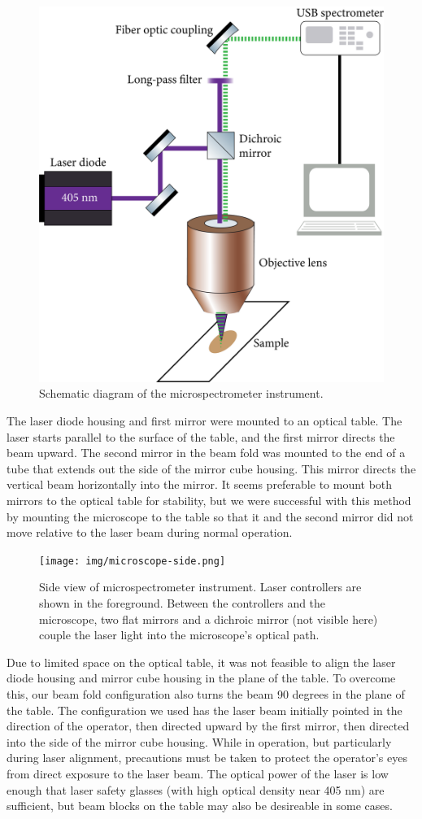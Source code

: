 \begin{figure}[h]
    \centering
    \includegraphics[width=.75\textwidth]{img/optical-diagram.png}
    \caption{Schematic diagram of the microspectrometer instrument.}
    \label{img:optical-diagram}
\end{figure}

The laser diode housing and first mirror were mounted to an optical table. The laser starts parallel to the surface of the table, and the first mirror directs the beam upward. The second mirror in the beam fold was mounted to the end of a tube that extends out the side of the mirror cube housing. This mirror directs the vertical beam horizontally into the mirror. It seems preferable to mount both mirrors to the optical table for stability, but we were successful with this method by mounting the microscope to the table so that it and the second mirror did not move relative to the laser beam during normal operation.

\begin{figure}[H]
    \centering
    \texttt{[image: img/microscope-side.png]}
    \caption[Side view of microspectrometer instrument.]{Side view of microspectrometer instrument. Laser controllers are shown in the foreground. Between the controllers and the microscope, two flat mirrors and a dichroic mirror (not visible here) couple the laser light into the microscope's optical path.}
    \label{img:microscope-side}
\end{figure}

Due to limited space on the optical table, it was not feasible to align the laser diode housing and mirror cube housing in the plane of the table. To overcome this, our beam fold configuration also turns the beam 90 degrees in the plane of the table. The configuration we used has the laser beam initially pointed in the direction of the operator, then directed upward by the first mirror, then directed into the side of the mirror cube housing. While in operation, but particularly during laser alignment, precautions must be taken to protect the operator's eyes from direct exposure to the laser beam. The optical power of the laser is low enough that laser safety glasses (with high optical density near 405 nm) are sufficient, but beam blocks on the table may also be desireable in some cases.


